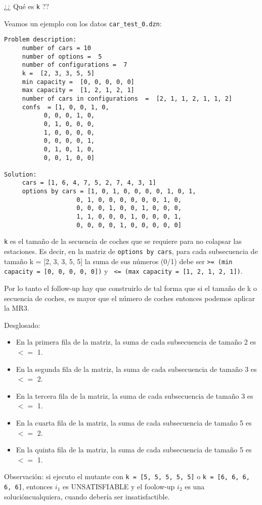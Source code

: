 ¿¿ Qué es  \texttt{k} ??

Veamos un ejemplo con los datos \texttt{car\_test\_0.dzn}:

\begin{verbatim}
Problem description: 
	 number of cars = 10
	 number of options =  5
	 number of configurations =  7
	 k =  [2, 3, 3, 5, 5]
	 min capacity =  [0, 0, 0, 0, 0]
	 max capacity =  [1, 2, 1, 2, 1]
	 number of cars in configurations  =  [2, 1, 1, 2, 1, 1, 2]
	 confs  = [1, 0, 0, 1, 0, 
           0, 0, 0, 1, 0, 
           0, 1, 0, 0, 0, 
           1, 0, 0, 0, 0, 
           0, 0, 0, 0, 1, 
           0, 1, 0, 1, 0, 
           0, 0, 1, 0, 0]
 
Solution: 
	 cars = [1, 6, 4, 7, 5, 2, 7, 4, 3, 1]
	 options by cars = [1, 0, 1, 0, 0, 0, 0, 1, 0, 1, 
                    0, 1, 0, 0, 0, 0, 0, 0, 1, 0, 
                    0, 0, 0, 1, 0, 0, 1, 0, 0, 0, 
                    1, 1, 0, 0, 0, 1, 0, 0, 0, 1, 
                    0, 0, 0, 0, 1, 0, 0, 0, 0, 0]
\end{verbatim}


\texttt{k} es el tamaño de la secuencia de coches que se requiere para no colapsar las estaciones. Es decir,
en la matriz de \texttt{options by cars}, para 
cada subsecuencia de tamaño  k =  [2, 3, 3, 5, 5] la suma de sus números (0/1) debe ser \texttt{>= (min capacity =  [0, 0, 0, 0, 0])} y   \texttt{ <= (max capacity =  [1, 2, 1, 2, 1])}.

Por lo tanto el follow-up hay que construirlo de tal forma que si el tamaño de k o secuencia de coches, es mayor que el número de coches entonces podemos aplicar la MR3.

Desglosado:
\begin{itemize}
    \item En la primera fila de la matriz, la suma de cada subsecuencia de tamaño 2 es $<=$ 1.
    \item En la segunda fila de la matriz, la suma de cada subsecuencia de tamaño 3 es $<=$ 2.
    \item En la tercera fila de la matriz, la suma de cada subsecuencia de tamaño 3 es $<=$ 1.
    \item En la cuarta fila de la matriz, la suma de cada subsecuencia de tamaño 5 es $<=$ 2.
    \item En la quinta fila de la matriz, la suma de cada subsecuencia de tamaño 5 es $<=$ 1.
\end{itemize}


Observación: si ejecuto el mutante con \texttt{k =  [5, 5, 5, 5, 5]} o \texttt{k =  [6, 6, 6, 6, 6]}, 
entonces $i_1$ es UNSATISFIABLE y el foolow-up $i_2$ es una solucióncualquiera, cuando debería ser insatisfactible.

